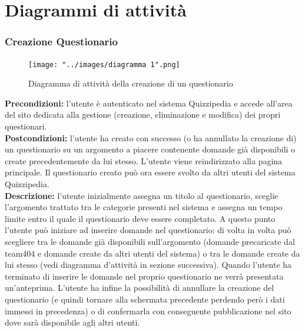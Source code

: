 \documentclass[a4paper,11pt]{article}
\begin{document}
	\section{Diagrammi di attività}
	
\subsubsection{Creazione Questionario}
\begin{figure}[h!]
\begin{center}
	\centerline{\texttt{[image: "../images/diagramma 1".png]}}
	\caption{Diagramma di attività della creazione di un questionario}
\end{center}
\end{figure}
\textbf{Precondizioni:} l'utente è autenticato nel sistema Quizzipedia e accede all'area del sito dedicata alla gestione (creazione, eliminazione e modifica) dei propri questionari.\\
\textbf{Postcondizioni:} l'utente ha creato con successo (o ha annullato la creazione di) un questionario su un argomento a piacere contenente domande già disponibili o create precedentemente da lui stesso. L'utente viene reindirizzato alla pagina principale. Il questionario creato può ora essere svolto da altri utenti del sistema Quizzipedia.\\ %
\textbf{Descrizione:} l'utente inizialmente assegna un titolo al questionario, sceglie l'argomento trattato tra le categorie presenti nel sistema e assegna un tempo limite entro il quale il questionario deve essere completato. A questo punto l'utente può iniziare ad inserire domande nel questionario: di volta in volta può scegliere tra le domande già disponibili sull'argomento (domande precaricate dal team404 e domande create da altri utenti del sistema) o tra le domande create da lui stesso (vedi diagramma d'attività in sezione successiva). Quando l'utente ha terminato di inserire le domande nel proprio questionario ne verrà presentata un'anteprima. L'utente ha infine la possibilità di annullare la creazione del questionario (e quindi tornare alla schermata precedente perdendo però i dati immessi in precedenza) o di confermarla con conseguente pubblicazione nel sito dove sarà disponibile agli altri utenti.\\

\newpage
\end{document}
